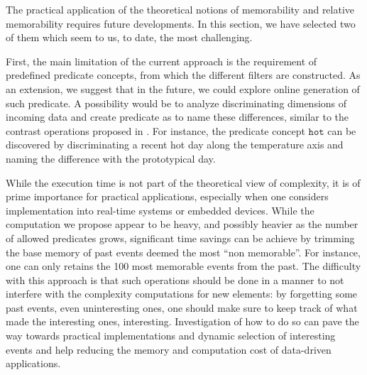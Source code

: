 \documentclass[entropy,article,submit,moreauthors,pdftex]{Definitions/mdpi}
\begin{document}
The practical application of the theoretical notions of memorability and relative memorability requires future developments. In this section, we have selected two of them which seem to us, to date, the most challenging.


First, the main limitation of the current approach is the requirement of
predefined predicate concepts, from which the different filters are constructed.
As an extension, we suggest that in the future, we could explore online
generation of such predicate. A possibility would be to analyze discriminating
dimensions of incoming data and create predicate as to name these differences,
similar to the contrast operations proposed in \cite{dessalles_conceptual_2015,
    gardenfors2004conceptual}. For instance, the predicate concept $\mathtt{hot}$
can be discovered by discriminating a recent hot day along the
temperature axis and naming the difference with the prototypical day.


While the execution time is not part of the theoretical view of complexity, it
is of prime importance for practical applications, especially when one considers
implementation into real-time systems or embedded devices. While the computation
we propose appear to be heavy, and possibly heavier as the number of allowed
predicates grows, significant time savings can be achieve by trimming the base
memory of past events deemed the most ``non memorable''. For instance, one can
only retains the 100 most memorable events from the past. The difficulty with
this approach is that such operations should be done in a manner to not
interfere with the complexity computations for new elements: by forgetting some
past events, even uninteresting ones, one should make sure to keep track of what
made the interesting ones, interesting. Investigation of how to do so can pave
the way towards practical implementations and dynamic selection of interesting
events and help reducing the memory and computation cost of data-driven applications.


\end{document}
